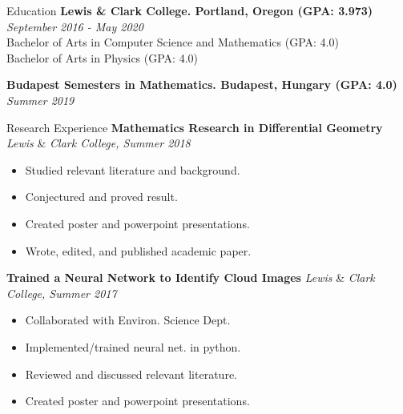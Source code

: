 \documentclass{resume}
\begin{document}
\begin{rSection}{Education}
    \textbf{Lewis \& Clark College. Portland, Oregon (GPA: 3.973)} \hfill \textit{September 2016 - May 2020}\\
    Bachelor of Arts in Computer Science and Mathematics (GPA: 4.0)\\
    Bachelor of Arts in Physics (GPA: 4.0)

    \textbf{Budapest Semesters in Mathematics. Budapest, Hungary (GPA: 4.0)} \hfill \textit{Summer 2019}
\end{rSection}
\begin{rSection}{Research Experience}
    \textbf{Mathematics Research in Differential Geometry} \hfill
    \textit{Lewis} \& \textit{Clark College, Summer 2018} 
    \vspace{-3.5mm}
    \begin{multicols}{2}
        \begin{itemize}
            \item Studied relevant literature and background.
            \item Conjectured and proved result.
            \item Created poster and powerpoint presentations.
            \item Wrote, edited, and published academic paper.
        \end{itemize}
    \end{multicols} 
    \vspace{-4mm}
    \textbf{Trained a Neural Network to Identify Cloud Images} \hfill
\textit{Lewis} \& \textit{Clark College, Summer 2017}
    \vspace{-3.5mm}
    \begin{multicols}{2}
        \begin{itemize}
            \item Collaborated with Environ. Science Dept.
            \item Implemented/trained neural net. in python.
            \item Reviewed and discussed relevant literature.
            \item Created poster and powerpoint presentations.
        \end{itemize}
    \end{multicols} 
    \vspace{-4mm}
\end{rSection}
\end{document}
